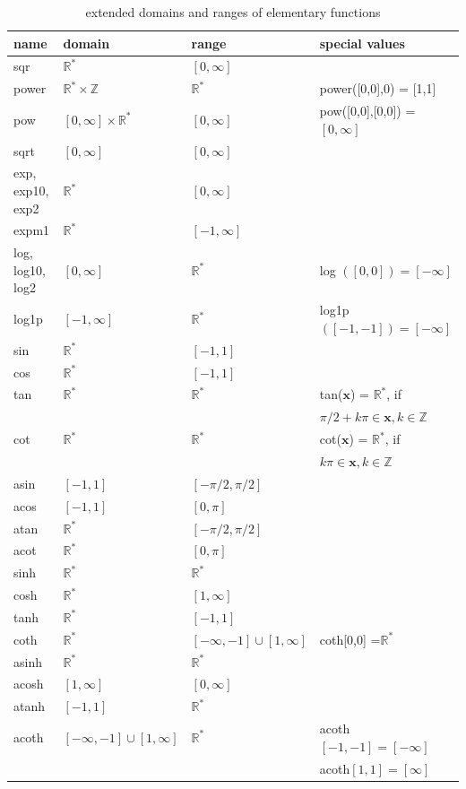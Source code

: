 \documentclass{report}
\newcommand{\Rs}{\mathbb{R}^*}
\newcommand{\xx}{\mathbf{x}}
\begin{document}
\begin{table}
\begin{tabular}{llll}
\hline
name& domain & range &special values\\
\hline
sqr & $\Rs$ & $[0,\infty]$ &\\
power &$\Rs \times \mathbb{Z}$ & $\Rs$&power([0,0],0) = [1,1]\\ 
pow &$ [0,\infty]\times \Rs$ & $[0,\infty]$&pow([0,0],[0,0]) =$[0,\infty]$ \\ 
sqrt & $[0,\infty]$& $[0,\infty]$ &\\
exp, exp10, exp2 &  $\Rs$ & $[0,\infty]$ &\\
expm1&  $\Rs$ & $[-1,\infty]$ &\\
log, log10, log2 & $[0,\infty]$&$\Rs$&log $( [0,0]) = [-\infty]$\\ 
log1p &$[-1,\infty]$ &$\Rs$&log1p $( [-1,-1]) = [-\infty]$\\
 \hline
sin& $\Rs$& $[-1,1]$&\\
cos& $\Rs$& $[-1,1]$&\\
tan& $\Rs$& $\Rs$& tan($\xx$) = $\Rs$, if\\
&&&$\pi/2 + k\pi \in \xx, k\in \mathbb{Z}$\\
cot& $\Rs$& $\Rs$& cot($\xx$) = $\Rs$, if\\
&&&$ k\pi \in \xx, k\in \mathbb{Z}$\\
asin& $[-1,1]$&$[-\pi/2,\pi/2]$&\\
acos& $[-1,1]$&$[0,\pi]$&\\
atan& $\Rs$&$[-\pi/2,\pi/2]$&\\
acot& $\Rs$&$[0,\pi]$&\\ \hline
sinh& $\Rs$&$\Rs$&\\
cosh&$\Rs$&$[1,\infty]$&\\
tanh &$\Rs$&$[-1,1]$&\\
coth&$\Rs$&$[-\infty,-1]\cup[1,\infty]$&coth[0,0] =$\Rs$\\ 
asinh& $\Rs$&$\Rs$&\\
acosh&$[1,\infty]$&$[0,\infty]$&\\
atanh &$[-1,1]$&$\Rs$&\\
acoth&$[-\infty,-1]\cup[1,\infty]$&$\Rs$&acoth$[-1,-1]=[-\infty]$\\
&&&acoth$[1,1]=[\infty]$\\
\hline
\end{tabular}
\caption{\label{sf} extended domains and ranges of elementary functions}
\end{table}
\end{document}
